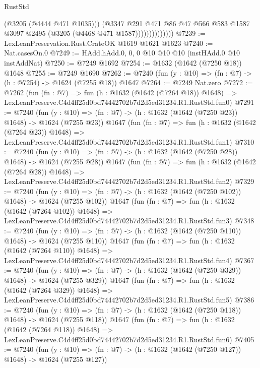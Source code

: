 \begin{lexlean}{RustStd}
\begin{coremodule}
                            (@3205 (@4444 @471 @1035)))
                          (@3347
                            @291
                            @471
                            @86
                            @47
                            @566
                            @583
                            @1587
                            @3097
                            @2495
                            (@3205 (@4468 @471 @1587))))))))))))))
@7239 := LexLeanPreservation.Rust.CrateOK @1619 @1621 @1623
@7240 := Nat.casesOn.{0}
@7249 := HAdd.hAdd.{0, 0, 0} @10 @10 @10 (instHAdd.{0} @10 instAddNat)
@7250 := @7249 @1692
@7254 := @1632 (@1642 (@7250 @18)) @1648
@7255 := @7249 @1690
@7262 := @7240 (fun (y : @10) => (fn : @7) -> (h : @7254) -> @1624 (@7255 @18)) @1647
@7264 := @7249 Nat.zero
@7272 := @7262
    (fun (fn : @7) =>
    fun (h : @1632 (@1642 (@7264 @18)) @1648) =>
    LexLeanPreserve.C4d4ff25d0bd74442702b7d2d5ed31234.R1.RustStd.fun0)
@7291 := @7240
    (fun (y : @10) => (fn : @7) -> (h : @1632 (@1642 (@7250 @23)) @1648) -> @1624 (@7255 @23))
    @1647
    (fun (fn : @7) =>
    fun (h : @1632 (@1642 (@7264 @23)) @1648) =>
    LexLeanPreserve.C4d4ff25d0bd74442702b7d2d5ed31234.R1.RustStd.fun1)
@7310 := @7240
    (fun (y : @10) => (fn : @7) -> (h : @1632 (@1642 (@7250 @28)) @1648) -> @1624 (@7255 @28))
    @1647
    (fun (fn : @7) =>
    fun (h : @1632 (@1642 (@7264 @28)) @1648) =>
    LexLeanPreserve.C4d4ff25d0bd74442702b7d2d5ed31234.R1.RustStd.fun2)
@7329 := @7240
    (fun (y : @10) => (fn : @7) -> (h : @1632 (@1642 (@7250 @102)) @1648) -> @1624 (@7255 @102))
    @1647
    (fun (fn : @7) =>
    fun (h : @1632 (@1642 (@7264 @102)) @1648) =>
    LexLeanPreserve.C4d4ff25d0bd74442702b7d2d5ed31234.R1.RustStd.fun3)
@7348 := @7240
    (fun (y : @10) => (fn : @7) -> (h : @1632 (@1642 (@7250 @110)) @1648) -> @1624 (@7255 @110))
    @1647
    (fun (fn : @7) =>
    fun (h : @1632 (@1642 (@7264 @110)) @1648) =>
    LexLeanPreserve.C4d4ff25d0bd74442702b7d2d5ed31234.R1.RustStd.fun4)
@7367 := @7240
    (fun (y : @10) => (fn : @7) -> (h : @1632 (@1642 (@7250 @329)) @1648) -> @1624 (@7255 @329))
    @1647
    (fun (fn : @7) =>
    fun (h : @1632 (@1642 (@7264 @329)) @1648) =>
    LexLeanPreserve.C4d4ff25d0bd74442702b7d2d5ed31234.R1.RustStd.fun5)
@7386 := @7240
    (fun (y : @10) => (fn : @7) -> (h : @1632 (@1642 (@7250 @118)) @1648) -> @1624 (@7255 @118))
    @1647
    (fun (fn : @7) =>
    fun (h : @1632 (@1642 (@7264 @118)) @1648) =>
    LexLeanPreserve.C4d4ff25d0bd74442702b7d2d5ed31234.R1.RustStd.fun6)
@7405 := @7240
    (fun (y : @10) => (fn : @7) -> (h : @1632 (@1642 (@7250 @127)) @1648) -> @1624 (@7255 @127))

\end{coremodule}
\end{lexlean}
